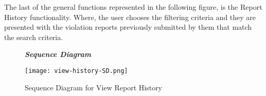 The last of the general  functions represented in the following figure, is the Report History functionality. Where, the user chooses the filtering criteria and they are presented with the violation reports previously submitted by them that match the search criteria.

\begin{figure}[H]
\begin{flushleft}\emph{\textbf{Sequence Diagram}}\end{flushleft}
\caption{Sequence Diagram for View Report History}
\label{fig:SD-View-Report-History}
\centering
\texttt{[image: view-history-SD.png]}
\end{figure}
